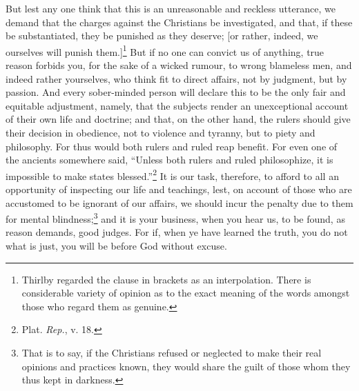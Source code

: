 But lest any one think that this is an unreasonable and reckless utterance, we demand that the charges against the Christians be investigated, and that, if these be substantiated, they be punished as they deserve; [or rather, indeed, we ourselves will punish them.]\footnote{Thirlby regarded the clause in brackets as an interpolation. There is considerable variety of opinion as to the exact meaning of the words amongst those who regard them as genuine.} But if no one can convict us of anything, true reason forbids you, for the sake of a wicked rumour, to wrong blameless men, and indeed rather yourselves, who think fit to direct affairs, not by judgment, but by passion. And every sober-minded person will declare this to be the only fair and equitable adjustment, namely, that the subjects render an unexceptional account of their own life and doctrine; and that, on the other hand, the rulers should give their decision in obedience, not to violence and tyranny, but to piety and philosophy. For thus would both rulers and ruled reap benefit. For even one of the ancients somewhere said, “Unless both rulers and ruled philosophize, it is impossible to make states blessed.”\footnote{Plat. \emph{Rep.}, v. 18.} It is our task, therefore, to afford to all an opportunity of inspecting our life and teachings, lest, on account of those who are accustomed to be ignorant of our affairs, we should incur the penalty due to them for mental blindness;\footnote{That is to say, if the Christians refused or neglected to make their real opinions and practices known, they would share the guilt of those whom they thus kept in darkness.} and it is your business, when you hear us, to be found, as reason demands, good judges. For if, when ye have learned the truth, you do not what is just, you will be before God without excuse.


